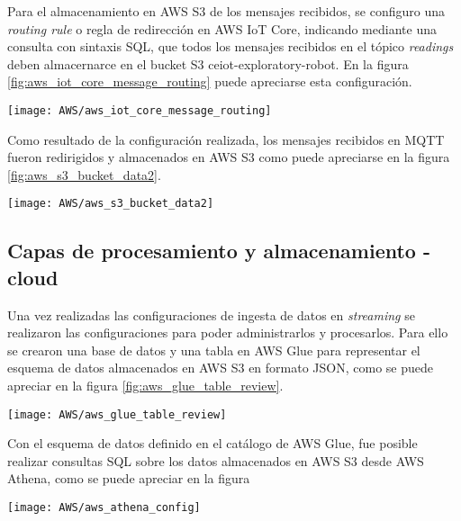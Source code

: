 Para el almacenamiento en AWS S3 de los mensajes recibidos, se configuro una \textit{routing rule} o regla de redirección en AWS IoT Core, indicando mediante una consulta con sintaxis SQL, que todos los mensajes recibidos en el tópico \textit{readings} deben almacernarce en el bucket S3 ceiot-exploratory-robot. En la figura \ref{fig:aws_iot_core_message_routing} puede apreciarse esta configuración.
 

\begin{center}
   \texttt{[image: AWS/aws\_iot\_core\_message\_routing]}
   \label{fig:aws_iot_core_message_routing}
\end{center}

Como resultado de la configuración realizada, los mensajes recibidos en MQTT fueron redirigidos y almacenados en AWS S3 como puede apreciarse en la figura \ref{fig:aws_s3_bucket_data2}.

\begin{center}
   \texttt{[image: AWS/aws\_s3\_bucket\_data2]}
   \label{fig:aws_s3_bucket_data2}
\end{center}


\subsection{Capas de procesamiento y almacenamiento - cloud}

Una vez realizadas las configuraciones de ingesta de datos en \textit{streaming} se realizaron las configuraciones para poder administrarlos y procesarlos.
Para ello se crearon una base de datos y una tabla en AWS Glue para representar el esquema de datos almacenados en AWS S3 en formato JSON, como se puede apreciar en la figura \ref{fig:aws_glue_table_review}.

\begin{center}
   \texttt{[image: AWS/aws\_glue\_table\_review]}
   \label{fig:aws_glue_table_review}
\end{center}

Con el esquema de datos definido en el catálogo de AWS Glue, fue posible realizar consultas SQL sobre los datos almacenados en AWS S3 desde AWS Athena, como se puede apreciar en la figura 

\begin{center}
   \texttt{[image: AWS/aws\_athena\_config]}
   \label{fig:aws_athena_config}
\end{center}





